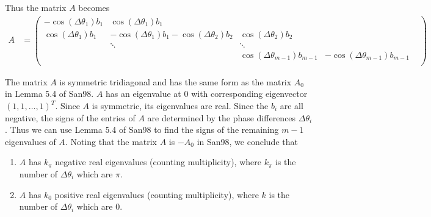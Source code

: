 \documentclass[12pt]{article}
\begin{document}
Thus the matrix $A$ becomes
\begin{align}\label{AdNLS}
A &= \begin{pmatrix}
-\cos(\Delta\theta_1) b_1 & \cos(\Delta\theta_1) b_1 & & &  \\
\cos(\Delta\theta_1) b_1 & -\cos(\Delta\theta_1) b_1 - \cos(\Delta\theta_2) b_2 & \cos(\Delta\theta_2) b_2 \\
& \ddots & \ddots \\
& &  \cos(\Delta\theta_{m-1}) b_{m-1} & -\cos(\Delta\theta_{m-1}) b_{m-1}  \\
\end{pmatrix}
\end{align}

The matrix $A$ is symmetric tridiagonal and has the same form as the matrix $A_0$ in Lemma 5.4 of San98. $A$ has an eigenvalue at 0 with corresponding eigenvector $(1, 1, \dots, 1)^T$. Since $A$ is symmetric, its eigenvalues are real. Since the $b_i$ are all negative, the signs of the entries of $A$ are determined by the phase differences $\Delta\theta_i$. Thus we can use Lemma 5.4 of San98 to find the signs of the remaining $m-1$ eigenvalues of $A$. Noting that the matrix $A$ is $-A_0$ in San98, we conclude that  
\begin{enumerate}
	\item $A$ has $k_\pi$ negative real eigenvalues (counting multiplicity), where $k_\pi$ is the number of $\Delta\theta_i$ which are $\pi$. 
	\item $A$ has $k_0$ positive real eigenvalues (counting multiplicity), where $k$ is the number of $\Delta\theta_i$ which are $0$. 
\end{enumerate}
\end{document}
